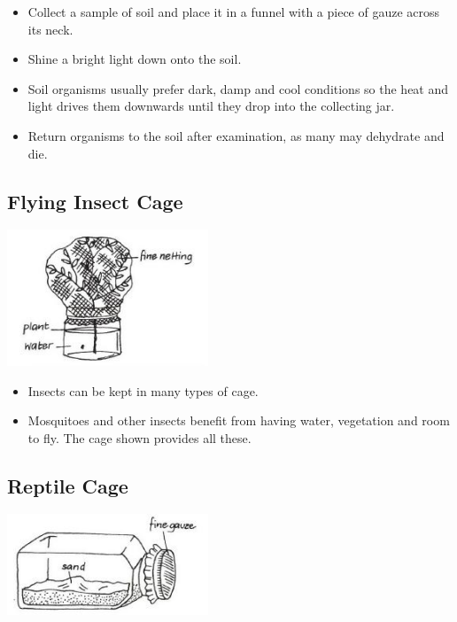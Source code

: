\begin{multicols}{2}
\begin{itemize}
\item Collect a sample of soil and
place it in a funnel with a piece
of gauze across its neck.
\item Shine a bright light down onto
the soil.
\item Soil organisms usually prefer
dark, damp and cool conditions
so the heat and light drives
them downwards until they
drop into the collecting jar.
\item Return organisms to the soil
after examination, as many may
dehydrate and die.
\end{itemize}


\subsection{Flying Insect Cage}

\begin{center}
\includegraphics[width=0.45\textwidth]{./img/vso/fly-cage.jpg}
\end{center}

\begin{itemize}
\item Insects can be kept in many
types of cage.
\item Mosquitoes and other insects
benefit from having water,
vegetation and room to fly. The
cage shown provides all these.
\end{itemize}


\subsection{Reptile Cage}

\begin{center}
\includegraphics[width=0.45\textwidth]{./img/vso/reptile-cage.jpg}
\end{center}


\end{multicols}

